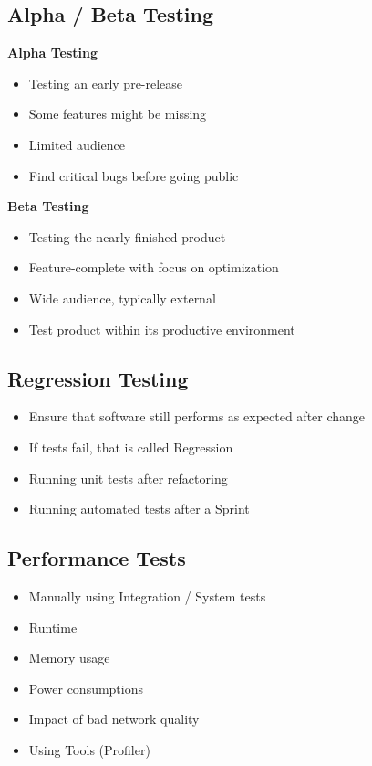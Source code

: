 \subsection{Alpha / Beta Testing}
\textbf{Alpha Testing}
\begin{itemize}
    \item Testing an early pre-release
    \item Some features might be missing
    \item Limited audience
    \item Find critical bugs before going public
\end{itemize}
\textbf{Beta Testing}
\begin{itemize}
    \item Testing the nearly finished product
    \item Feature-complete with focus on optimization
    \item Wide audience, typically external
    \item Test product within its productive environment
\end{itemize}

\subsection{Regression Testing}
\begin{itemize}
    \item Ensure that software still performs as expected after change
    \item If tests fail, that is called Regression
    \item Running unit tests after refactoring
    \item Running automated tests after a Sprint
\end{itemize}

\subsection{Performance Tests}
\begin{itemize}
    \item Manually using Integration / System tests
    \item Runtime
    \item Memory usage
    \item Power consumptions
    \item Impact of bad network quality
    \item Using Tools (Profiler)
\end{itemize}


